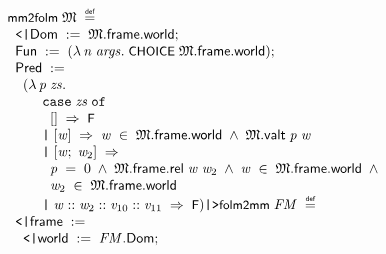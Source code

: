 \documentclass[letterpaper]{article}
\renewcommand{\HOLConst}[1]{{\textsf{\upshape\small #1}}}
\renewcommand{\HOLKeyword}[1]{\texttt{#1}}
\newenvironment{holmath}{\begin{displaymath}\begin{array}{l}}{\end{array}\end{displaymath}\ignorespacesafterend}
\begin{document}
\begin{holmath}
  \HOLConst{mm2folm}\;\HOLFreeVar{\ensuremath{\mathfrak{M}}}\;\HOLSymConst{\HOLTokenDefEquality{}}\\
\;\;\HOLTokenLeftrec{}\HOLFieldName{Dom}\;:=\;\HOLFreeVar{\ensuremath{\mathfrak{M}}}.\HOLFieldName{frame}.\HOLFieldName{world};\\
\;\;\HOLFieldName{Fun}\;:=\;(\HOLTokenLambda{}\HOLBoundVar{n}\;\HOLBoundVar{args}.\;\HOLConst{CHOICE}\;\HOLFreeVar{\ensuremath{\mathfrak{M}}}.\HOLFieldName{frame}.\HOLFieldName{world});\\
\;\;\HOLFieldName{Pred}\;:=\\
\;\;\;\;(\HOLTokenLambda{}\HOLBoundVar{p}\;\HOLBoundVar{zs}.\\
\;\;\;\;\;\;\;\;\;\HOLKeyword{case}\;\HOLBoundVar{zs}\;\HOLKeyword{of}\\
\;\;\;\;\;\;\;\;\;\;\;[]\;\HOLTokenImp{}\;\HOLConst{F}\\
\;\;\;\;\;\;\;\;\;\HOLTokenBar{}\;[\HOLBoundVar{w}]\;\HOLTokenImp{}\;\HOLBoundVar{w}\;\HOLSymConst{\HOLTokenIn{}}\;\HOLFreeVar{\ensuremath{\mathfrak{M}}}.\HOLFieldName{frame}.\HOLFieldName{world}\;\HOLSymConst{\HOLTokenConj{}}\;\HOLFreeVar{\ensuremath{\mathfrak{M}}}.\HOLFieldName{valt}\;\HOLBoundVar{p}\;\HOLBoundVar{w}\\
\;\;\;\;\;\;\;\;\;\HOLTokenBar{}\;[\HOLBoundVar{w};\;\HOLBoundVar{w\sb{\mathrm{2}}}]\;\HOLTokenImp{}\\
\;\;\;\;\;\;\;\;\;\;\;\HOLBoundVar{p}\;\HOLSymConst{=}\;\HOLNumLit{0}\;\HOLSymConst{\HOLTokenConj{}}\;\HOLFreeVar{\ensuremath{\mathfrak{M}}}.\HOLFieldName{frame}.\HOLFieldName{rel}\;\HOLBoundVar{w}\;\HOLBoundVar{w\sb{\mathrm{2}}}\;\HOLSymConst{\HOLTokenConj{}}\;\HOLBoundVar{w}\;\HOLSymConst{\HOLTokenIn{}}\;\HOLFreeVar{\ensuremath{\mathfrak{M}}}.\HOLFieldName{frame}.\HOLFieldName{world}\;\HOLSymConst{\HOLTokenConj{}}\\
\;\;\;\;\;\;\;\;\;\;\;\HOLBoundVar{w\sb{\mathrm{2}}}\;\HOLSymConst{\HOLTokenIn{}}\;\HOLFreeVar{\ensuremath{\mathfrak{M}}}.\HOLFieldName{frame}.\HOLFieldName{world}\\
\;\;\;\;\;\;\;\;\;\HOLTokenBar{}\;\HOLBoundVar{w}\HOLSymConst{::}\HOLBoundVar{w\sb{\mathrm{2}}}\HOLSymConst{::}\HOLBoundVar{v\sb{\mathrm{10}}}\HOLSymConst{::}\HOLBoundVar{v\sb{\mathrm{11}}}\;\HOLTokenImp{}\;\HOLConst{F})\HOLTokenRightrec{}
  \HOLConst{folm2mm}\;\HOLFreeVar{FM}\;\HOLSymConst{\HOLTokenDefEquality{}}\\
\;\;\HOLTokenLeftrec{}\HOLFieldName{frame}\;:=\\
\;\;\;\;\HOLTokenLeftrec{}\HOLFieldName{world}\;:=\;\HOLFreeVar{FM}.\HOLFieldName{Dom};\\

\end{holmath}
\end{document}
